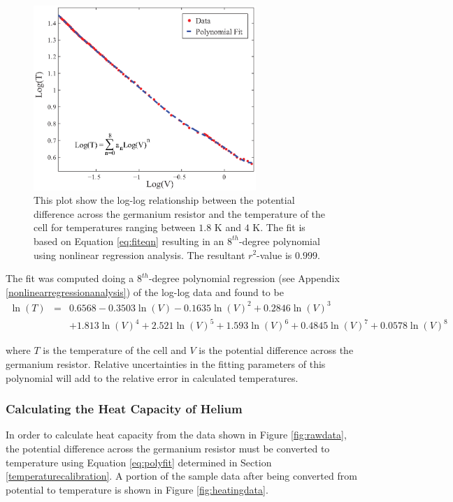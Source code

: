 \begin{figure}[htbp]
\begin{center}
\includegraphics[height=70mm]{./figures/polyfit.eps}
\caption{\small{This plot show the log-log relationship between the potential difference across the germanium resistor and the temperature of the cell for temperatures ranging between $1.8$ K and $4$ K.  The fit is based on Equation \ref{eq:fiteqn} resulting in an $8^{th}$-degree polynomial using nonlinear regression analysis.  The resultant $r^{2}$-value is $0.999$.}}
\label{fig:polyfit}
\end{center}
\end{figure}

The fit was computed doing a $8^{th}$-degree polynomial regression (see Appendix \ref{nonlinearregressionanalysis}) of the log-log data and found to be 
\begin{eqnarray}\label{eq:polyfit}
\ln(T) &=& 0.6568 - 0.3503\ln(V) - 0.1635\ln(V)^{2} + 0.2846\ln(V)^{3} \\
& & + 1.813\ln(V)^{4} + 2.521\ln(V)^{5} + 1.593\ln(V)^{6} + 0.4845\ln(V)^{7} + 0.0578\ln(V)^{8} \nonumber
\end{eqnarray}

where $T$ is the temperature of the cell and $V$ is the potential difference across the germanium resistor.  Relative uncertainties in the fitting parameters of this polynomial will add to the relative error in calculated temperatures.   

\subsubsection{Calculating the Heat Capacity of Helium}\label{calculatingtheheatcapacityofthecell}

In order to calculate heat capacity from the data shown in Figure \ref{fig:rawdata}, the potential difference across the germanium resistor must be converted to temperature using Equation \ref{eq:polyfit} determined in Section \ref{temperaturecalibration}. A portion of the sample data after being converted from potential to temperature is shown in Figure \ref{fig:heatingdata}.  

